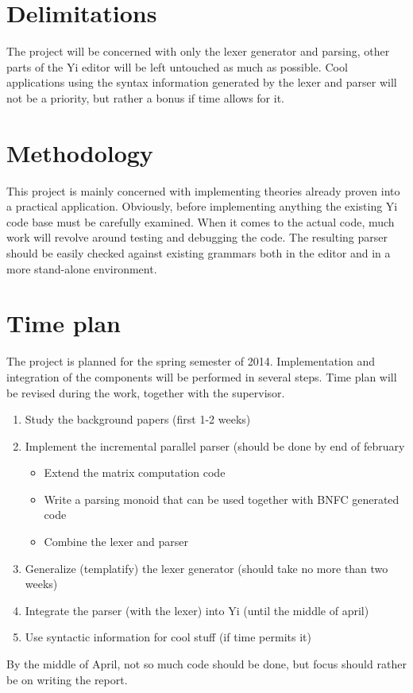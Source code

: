 \documentclass[a4paper,12pt]{article}
\begin{document}
\section*{Delimitations}
The project will be concerned with only the lexer generator and parsing, other
parts of the Yi editor will be left untouched as much as possible. Cool
applications using the syntax information generated by the lexer and parser will
not be a priority, but rather a bonus if time allows for it.

\section*{Methodology}
This project is mainly concerned with implementing theories already proven into
a practical application. Obviously, before implementing anything the existing Yi
code base must be carefully examined. When it comes to the actual code, much
work will revolve around testing and debugging the code. The resulting parser
should be easily checked against existing grammars both in the editor and in a
more stand-alone environment.

\section*{Time plan}
The project is planned for the spring semester of 2014. Implementation and
integration of the components will be performed in several steps. Time plan will
be revised during the work, together with the supervisor.
\begin{enumerate}
    \item{Study the background papers (first 1-2 weeks)}
    \item{Implement the incremental parallel parser (should be done by end of
          february}
        \begin{itemize}
            \item{Extend the matrix computation code}
            \item{Write a parsing monoid that can be used together with BNFC
                  generated code}
            \item{Combine the lexer and parser}
        \end{itemize}
    \item{Generalize (templatify) the lexer generator (should take no more than
          two weeks)}
    \item{Integrate the parser (with the lexer) into Yi (until the middle of
          april)}
    \item{Use syntactic information for cool stuff (if time permits it)}
\end{enumerate}
By the middle of April, not so much code should be done, but focus should rather
be on writing the report. 
\end{document}
